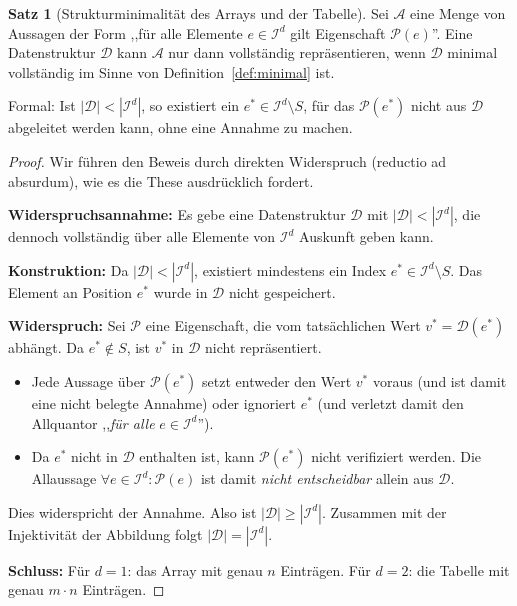 ﻿\documentclass[a4paper,12pt]{article}
\theoremstyle{definition}
\newtheorem{satz}{Satz}
\begin{document}
\begin{satz}[Strukturminimalit\"{a}t des Arrays und der Tabelle]
    \label{satz:strukturmin}
    Sei $\mathcal{A}$ eine Menge von Aussagen der Form
    ,,f\"{u}r alle Elemente $e \in \mathcal{I}^d$ gilt Eigenschaft $\mathcal{P}(e)$''.
    Eine Datenstruktur $\mathcal{D}$ kann $\mathcal{A}$ nur dann vollst\"{a}ndig
    repr\"{a}sentieren, wenn $\mathcal{D}$ minimal vollst\"{a}ndig im Sinne von
    Definition~\ref{def:minimal} ist.

    Formal: Ist $|\mathcal{D}| < |\mathcal{I}^d|$, so existiert ein
    $e^* \in \mathcal{I}^d \setminus S$, f\"{u}r das $\mathcal{P}(e^*)$ nicht
    aus $\mathcal{D}$ abgeleitet werden kann, ohne eine Annahme zu machen.
\end{satz}

\begin{proof}
    Wir f\"{u}hren den Beweis durch direkten Widerspruch (reductio ad absurdum),
    wie es die These ausdr\"{u}cklich fordert.

    \textbf{Widerspruchsannahme:} Es gebe eine Datenstruktur
    $\mathcal{D}$ mit $|\mathcal{D}| < |\mathcal{I}^d|$, die dennoch vollst\"{a}ndig
    \"{u}ber alle Elemente von $\mathcal{I}^d$ Auskunft geben kann.

    \textbf{Konstruktion:} Da $|\mathcal{D}| < |\mathcal{I}^d|$, existiert
    mindestens ein Index $e^* \in \mathcal{I}^d \setminus S$.
    Das Element an Position $e^*$ wurde in $\mathcal{D}$ nicht gespeichert.

    \textbf{Widerspruch:} Sei $\mathcal{P}$ eine Eigenschaft, die vom
    tats\"{a}chlichen Wert $v^* = \mathcal{D}(e^*)$ abh\"{a}ngt.
    Da $e^* \notin S$, ist $v^*$ in $\mathcal{D}$ nicht repr\"{a}sentiert.
    \begin{itemize}
        \item Jede Aussage \"{u}ber $\mathcal{P}(e^*)$ setzt entweder den Wert
              $v^*$ voraus (und ist damit eine nicht belegte Annahme) oder
              ignoriert $e^*$ (und verletzt damit den Allquantor
              ,,\emph{f\"{u}r alle} $e \in \mathcal{I}^d$'').
        \item Da $e^*$ nicht in $\mathcal{D}$ enthalten ist, kann $\mathcal{P}(e^*)$
              nicht verifiziert werden. Die Allaussage
              $\forall e \in \mathcal{I}^d: \mathcal{P}(e)$ ist damit
              \emph{nicht entscheidbar} allein aus $\mathcal{D}$.
    \end{itemize}
    Dies widerspricht der Annahme. Also ist $|\mathcal{D}| \geq |\mathcal{I}^d|$.
    Zusammen mit der Injektivit\"{a}t der Abbildung folgt
    $|\mathcal{D}| = |\mathcal{I}^d|$.

    \textbf{Schluss:}
    F\"{u}r $d = 1$: das Array mit genau $n$ Eintr\"{a}gen.
    F\"{u}r $d = 2$: die Tabelle mit genau $m \cdot n$ Eintr\"{a}gen. \qedhere
\end{proof}
\end{document}
